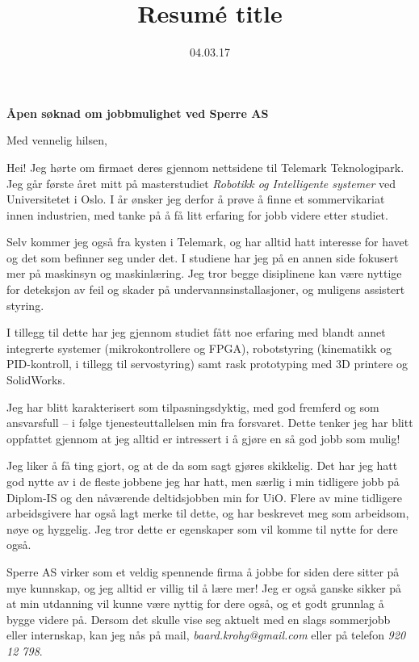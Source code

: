 \documentclass[11pt,a4paper,sans]{moderncv}        %
\title{Resumé title}                               %
\begin{document}

\date{04.03.17}
\opening{\large\textbf{Åpen søknad om jobbmulighet ved Sperre AS}}
\closing{Med vennelig hilsen,}

\makelettertitle

Hei! Jeg hørte om firmaet deres gjennom nettsidene til Telemark Teknologipark. Jeg går første året mitt på masterstudiet \emph{Robotikk og Intelligente systemer} ved Universitetet i Oslo. I år ønsker jeg derfor å prøve å finne et sommervikariat innen industrien, med tanke på å få litt erfaring for jobb videre etter studiet.

Selv kommer jeg også fra kysten i Telemark, og har alltid hatt interesse for havet og det som befinner seg under det. I studiene har jeg på en annen side fokusert mer på maskinsyn og maskinlæring. Jeg tror begge disiplinene kan være nyttige for deteksjon av feil og skader på undervannsinstallasjoner, og muligens assistert styring.

I tillegg til dette har jeg gjennom studiet fått noe erfaring med blandt annet integrerte systemer (mikrokontrollere og FPGA), robotstyring (kinematikk og PID-kontroll, i tillegg til servostyring) samt rask prototyping med 3D printere og SolidWorks.

Jeg har blitt karakterisert som tilpasningsdyktig, med god fremferd og som ansvarsfull -- i følge tjenesteuttallelsen min fra forsvaret. Dette tenker jeg har blitt oppfattet gjennom at jeg alltid er intressert i å gjøre en så god jobb som mulig!

Jeg liker å få ting gjort, og at de da som sagt gjøres skikkelig. Det har jeg hatt god nytte av i de fleste jobbene jeg har hatt, men særlig i min tidligere jobb på Diplom-IS og den nåværende deltidsjobben min for UiO. Flere av mine tidligere arbeidsgivere har også lagt merke til dette, og har beskrevet meg som arbeidsom, nøye og hyggelig.
Jeg tror dette er egenskaper som vil komme til nytte for dere også.

Sperre AS virker som et veldig spennende firma å jobbe for siden dere sitter på mye kunnskap, og jeg alltid er villig til å lære mer! Jeg er også ganske sikker på at min utdanning vil kunne være nyttig for dere også, og et godt grunnlag å bygge videre på. Dersom det skulle vise seg aktuelt med en slags sommerjobb eller internskap, kan jeg nås på mail, \emph{baard.krohg@gmail.com} eller på telefon \emph{920 12 798}.


\makeletterclosing
\end{document}
